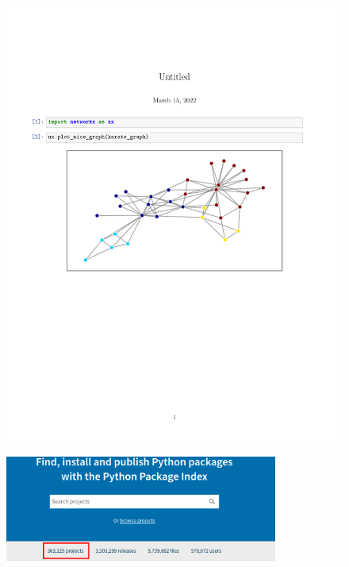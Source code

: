 \documentclass[fleqn]{beamer}
\begin{document}
    \begin{frame}
        \begin{figure}[H]
            \centering
            \includegraphics[width=1.1\textwidth,
                             clip,
                             trim=0cm 10cm 0cm 7cm]
                             {./pics/code_example.pdf}
        \end{figure}
    \end{frame}

    \begin{frame}
        \begin{figure}[H]
            \centering
            \includegraphics[width=0.8\textwidth]
                             {./pics/pypi.png}
        \end{figure}
    \end{frame}
\end{document}

